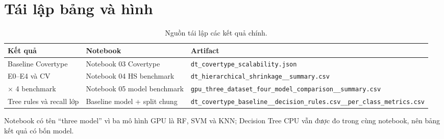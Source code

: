 \chapter{Tái lập bảng và hình}

\begin{table}[H]
    \centering
    \footnotesize
    \caption[Nguồn tái lập bảng và hình]{Nguồn tái lập các kết quả chính.}
    \label{tab:artifact-traceability}
    \begin{tabularx}{\textwidth}{@{}>{\raggedright\arraybackslash}p{3.0cm}>{\raggedright\arraybackslash}p{4.1cm}X@{}}
        \toprule
        \textbf{Kết quả} & \textbf{Notebook} & \textbf{Artifact} \\
        \midrule
        Baseline Covertype & Notebook 03 Covertype & \nolinkurl{dt_covertype_scalability.json} \\
        E0--E4 và CV & Notebook 04 HS benchmark & \nolinkurl{dt_hierarchical_shrinkage__summary.csv} \\
        3 $\times$ 4 benchmark & Notebook 05 model benchmark & \nolinkurl{gpu_three_dataset_four_model_comparison__summary.csv} \\
        Tree rules và recall lớp & Baseline model + split chung & \nolinkurl{dt_covertype_baseline__decision_rules.csv}\newline \nolinkurl{__per_class_metrics.csv} \\
        \bottomrule
    \end{tabularx}
\end{table}

Notebook có tên ``three model'' vì ba mô hình GPU là RF, SVM và KNN; Decision Tree CPU vẫn được đo trong cùng notebook, nên bảng kết quả có bốn model.
